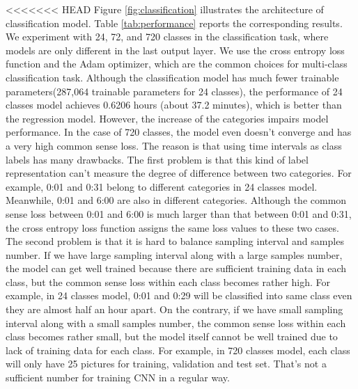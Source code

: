 \documentclass{article}
\begin{document}
<<<<<<< HEAD
Figure \ref{fig:classification} illustrates the architecture of classification model. Table \ref{tab:performance} reports the corresponding results. We experiment with 24, 72, and 720 classes in the classification task, where models are only different in the last output layer. We use the cross entropy loss function and the Adam optimizer, which are the common choices for multi-class classification task. Although the classification model has much fewer trainable parameters(287,064 trainable parameters for 24 classes), the performance of 24 classes model achieves 0.6206 hours (about 37.2 minutes), which is better than the regression model. However, the increase of the categories impairs model performance. In the case of 720 classes, the model even doesn't converge and has a very high common sense loss. The reason is that using time intervals as class labels has many drawbacks. The first problem is that this kind of label representation can't measure the degree of difference between two categories. For example, 0:01 and 0:31 belong to different categories in 24 classes model. Meanwhile, 0:01 and 6:00 are also in different categories. Although the common sense loss between 0:01 and 6:00 is much larger than that between 0:01 and 0:31, the cross entropy loss function assigns the same loss values to these two cases. The second problem is that it is hard to balance sampling interval and samples number. If we have large sampling interval along with a large samples number, the model can get well trained because there are sufficient training data in each class, but the common sense loss within each class becomes rather high. For example, in 24 classes model, 0:01 and 0:29 will be classified into same class even they are almost half an hour apart. On the contrary, if we have small sampling interval along with a small samples number, the common sense loss within each class becomes rather small, but the model itself cannot be well trained due to lack of training data for each class. For example, in 720 classes model, each class will only have 25 pictures for training, validation and test set. That's not a sufficient number for training CNN in a regular way.
\end{document}
